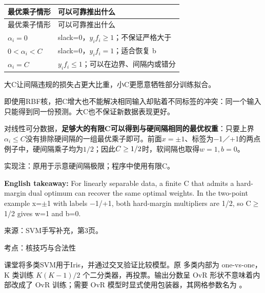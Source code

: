 \begingroup
\small\setlength{\tabcolsep}{3pt}
\renewcommand{\arraystretch}{1.22}
\begin{longtable}{@{}>{\raggedright\arraybackslash}p{}>{\raggedright\arraybackslash}p{}@{}}
\toprule
最优乘子情形 & 可以可靠推出什么 \\
\midrule\endfirsthead
最优乘子情形 & 可以可靠推出什么 \\
\midrule\endhead
\bottomrule\endfoot
\(\alpha_i=0\) & slack=0，\(y_if_i\ge1\)；不保证严格大于 \\
\(0<\alpha_i<C\) & slack=0，\(y_if_i=1\)；适合恢复 b \\
\(\alpha_i=C\) & \(y_if_i\le1\)；可以在边界、间隔内或错分 \\
\end{longtable}
\endgroup


大C让间隔违规的损失占更大比重，小C更愿意牺牲部分训练拟合。


即使用RBF核，把C增大也不能解决相同输入却贴着不同标签的冲突：同一个输入只能得到同一份预测。大C也不保证新数据表现更好。


对线性可分数据，\textbf{足够大的有限C可以得到与硬间隔相同的最优权重}：只要上界\(\alpha_i\le C\)没有排除硬间隔的一组最优乘子即可。前面\(x=\pm1\)、标签为\ensuremath{-}1／+1的两点例子中，硬间隔乘子均为\(1/2\)；因此\(C\nobreak\ge\nobreak1/2\)时，软间隔也取得\(w=1,b=0\)。


实现注：原用于示意硬间隔极限；程序中使用有限C。


\textbf{English takeaway:} For linearly separable data, a finite C that admits a hard-margin dual optimum can recover the same optimal weights. In the two-point example x=\ensuremath{\pm}1 with labels \ensuremath{-}1/+1, both hard-margin multipliers are 1/2, so C\ensuremath{\ge}1/2 gives w=1 and b=0.


来源：SVM手写补充，第3页。








考点：核技巧与合法性
  

课堂将多类SVM用于Iris，并通过交叉验证比较模型。原  多类内部为 one-vs-one，K 类训练 \(K(K-1)/2\) 个二分类器，再投票。输出分数呈 OvR 形状不意味着内部改成了 OvR 训练；需要 OvR 模型时显式使用包装器，其网格参数名为 。


